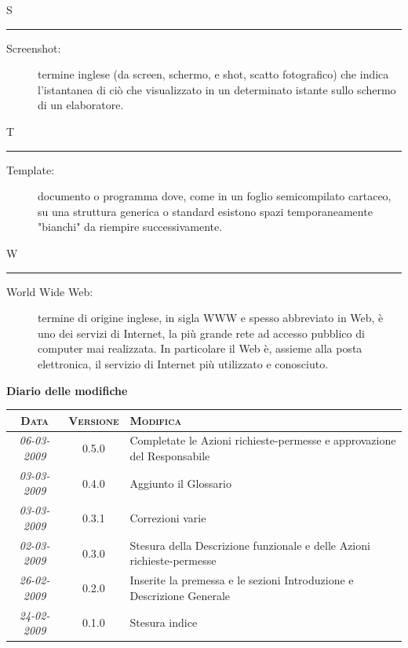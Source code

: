 \documentclass[11pt,a4paper]{article}
\newcommand{\modifiche} 
{
\newpage
\begin{center}
\textbf{Diario delle modifiche} \\
\bigskip
\begin{tabular}{|c|c|p{0.62\textwidth}|}
\hline
\textsc{Data} & \textsc{Versione} & \textsc{Modifica} \\
\hline
\hline
\textit{06-03-2009} & 0.5.0 & Completate le Azioni richieste-permesse e approvazione del Responsabile\\
\hline
\textit{03-03-2009} & 0.4.0 & Aggiunto il Glossario\\
\hline
\textit{03-03-2009} & 0.3.1 & Correzioni varie\\
\hline
\textit{02-03-2009} & 0.3.0 & Stesura  della Descrizione funzionale e delle Azioni richieste-permesse\\
\hline
\textit{26-02-2009} & 0.2.0 & Inserite la premessa e le sezioni Introduzione e Descrizione Generale\\
\hline
\textit{24-02-2009} & 0.1.0 & Stesura indice\\
\hline
\end{tabular}
\end{center}
}
\begin{document}
\bigskip
\Huge S \bigskip
\hrule
\smallskip
\normalsize
\begin{description}
	\item[Screenshot:] termine inglese (da screen, schermo, e shot, scatto fotografico) che indica l'istantanea di ciò che visualizzato in un determinato istante sullo schermo di un elaboratore.
\end{description}
\bigskip
\Huge T \bigskip
\hrule
\smallskip
\normalsize
\begin{description}
	\item[Template:] documento o programma dove, come in un foglio semicompilato cartaceo, su una struttura generica o standard esistono spazi temporaneamente "bianchi" da riempire successivamente.
\end{description}
\bigskip
\Huge W \bigskip
\hrule
\smallskip
\normalsize
\begin{description}
	\item[World Wide Web:] termine di origine inglese, in sigla WWW e spesso abbreviato in Web, è uno dei servizi di Internet, la più grande rete ad accesso pubblico di computer mai realizzata. In particolare il Web è, assieme alla posta elettronica, il servizio di Internet più utilizzato e conosciuto.
\end{description}
\modifiche
\end{document}
